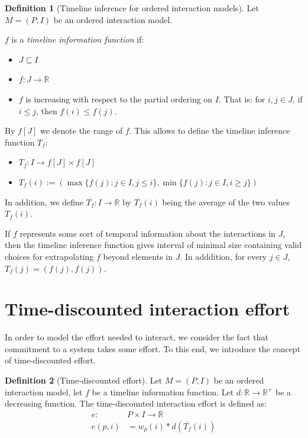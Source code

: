 \documentclass[a4paper,11pt]{book}
\newcommand{\bb}{\mathbb}
\newcommand{\ov}{\overline}
\theoremstyle{definition}
\newtheorem{definition}{Definition}
\begin{document}
\begin{definition}[Timeline inference for ordered interaction models]
    Let $M = (P, I)$ be an ordered interaction model. 

    $f$ is a \emph{timeline information function} if:
    \begin{itemize}
        \item $J \subseteq I$ 
        \item $f : J \to \bb{R}$
        \item $f$ is increasing with respect to the partial ordering on $I$. That is:
            for $i,j \in J$, if $i \leq j$, then $f(i) \leq f(j)$. 
    \end{itemize}

    By $f[J]$ we denote the range of $f$.
    This allows to define the timeline inference function $T_f$:

    \begin{itemize}
        \item $T_f : I \to f[J] \times f[J]$
        \item $T_f(i) := (\max \{f(j): j \in I, j \leq i\}, \min \{f(j) : j \in I, i \geq j\})$
    \end{itemize}
    
    In addition, we define $\ov{T_f} : I \to \bb{R}$ by $\ov{T_f}(i)$ being the average of the
    two values $T_f(i)$.
\end{definition}


If $f$ represents some sort of temporal information about the interactions in $J$, 
then the timeline inference function gives interval of minimal size containing valid choices for extrapolating
$f$ beyond elements in $J$. In adddition, for every $j \in J$, $T_f(j) = (f(j), f(j))$.

\section{Time-discounted interaction effort}

In order to model the effort needed to interact, we consider the fact that commitment to
a system takes some effort. To this end, we introduce the concept of time-discounted effort.

\begin{definition}[Time-discounted effort]
    Let $M = (P, I)$ be an ordered interaction model, let $f$ be a timeline information function.
    Let $d: \bb{R} \to \bb{R}^+$ be a decreasing function. The time-discounted interaction
    effort is defined as:
    \begin{align*}
        e: & P \times I \to \bb{R} \\
        e(p, i) &= w_p(i)*d(\ov{T_f}(i)) \\
    \end{align*}
\end{definition}
\end{document}
